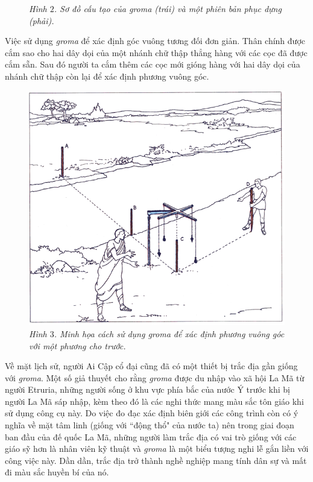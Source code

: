 \begin{multicols}{2}
\begin{figure}[H]
		\caption{\small\textit{\color{toanhocdoisong}Hình $2$. Sơ đồ cấu tạo của groma (trái) và một phiên bản phục dựng (phải).}}
		\vspace*{-10pt}
	\end{figure}
	Việc sử dụng \textit{groma} để xác định góc vuông tương đối đơn giản. Thân chính được cắm sao cho hai dây dọi của một nhánh chữ thập  thẳng hàng với các cọc đã được cắm sẵn. Sau đó người ta cắm thêm các cọc mới gióng hàng với hai dây dọi của nhánh chữ thập còn lại để xác định phương vuông góc.
	\begin{figure}[H]
		\vspace*{-5pt}
		\centering
		\captionsetup{labelformat= empty, justification=centering}
		\includegraphics[width= 1\linewidth]{3}
		\caption{\small\textit{\color{toanhocdoisong}Hình $3$. Minh họa cách sử dụng groma để xác định phương vuông góc với một phương cho trước.}}
		\vspace*{-10pt}
	\end{figure}
	Về mặt lịch sử, người Ai Cập cổ đại cũng đã có một thiết bị trắc địa gần giống với \textit{groma}. Một số giả thuyết cho rằng \textit{groma} được du nhập vào xã hội La Mã từ người Etruria, những người sống ở khu vực phía bắc của nước Ý trước khi bị người La Mã sáp nhập, kèm theo đó là các nghi thức mang màu sắc tôn giáo khi sử dụng công cụ này. Do việc đo đạc xác định biên giới các công trình còn có ý nghĩa về mặt tâm linh (giống với ``động thổ" của nước ta) nên trong giai đoạn ban đầu của đế quốc La Mã, những người làm trắc địa có vai trò giống với các giáo sỹ hơn là nhân viên kỹ thuật và \textit{groma} là một biểu tượng nghi lễ gắn liền với công việc này. Dần dần, trắc địa trở thành nghề nghiệp mang tính dân sự và mất đi màu sắc huyền bí của nó.

\end{multicols}
